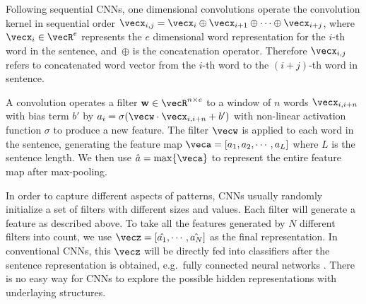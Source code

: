 Following sequential CNNs, one dimensional convolutions operate the convolution kernel in sequential order $\vecx_{i,j} =\vecx_i \oplus   \vecx_{i+1}\oplus \cdots \oplus  \vecx_{i+j}$, where~$\vecx_i \in \vecR^e$ represents the $e$ dimensional word representation for the $i$-th word in the sentence, and~$\oplus$ is the concatenation operator. Therefore $\vecx_{i,j}$ refers to concatenated word vector from the $i$-th word to the $(i+j)$-th word in sentence.


A convolution operates a filter $\mathbf{w} \in  \vecR^{n \times e}$ to a window of $n$ words $\vecx_{i,i+n}$ with bias term $b'$ by $a_i = \sigma (\vecw \cdot  \vecx_{i,i+n}+b' )$ 
with non-linear activation function $\sigma$ to produce a new feature.
The filter $\vecw$ is applied to each word in the sentence, generating the feature map $\veca= [a_1, a_2, \cdots, a_L]$ where $L$ is the sentence length.
We then use $\hat{a} = \max \{ \veca \}$ to represent the entire feature map after max-pooling. 




In order to capture different aspects of patterns, CNNs usually randomly initialize a set of filters with different sizes and values. 
Each filter will generate a feature as described above. 
To take all the features generated by $N$ different filters into count, we use $\vecz = [\hat{a_1}, \cdots, \hat{a_N}]$ as the final representation.
In conventional CNNs, this $\vecz$ will be directly fed into classifiers after the sentence representation is obtained, e.g.~fully connected neural networks \cite{kim:2014}. There is no easy way for CNNs to explore the possible hidden representations with underlaying structures.



